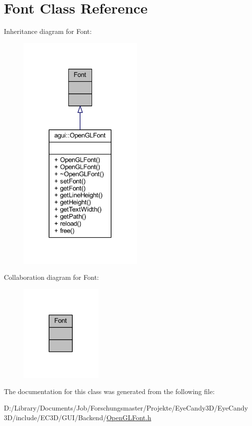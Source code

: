 \hypertarget{class_font}{}\section{Font Class Reference}
\label{class_font}


Inheritance diagram for Font\+:
\nopagebreak
\begin{figure}[H]
\begin{center}
\leavevmode
\includegraphics[width=176pt]{class_font__inherit__graph}
\end{center}
\end{figure}


Collaboration diagram for Font\+:
\nopagebreak
\begin{figure}[H]
\begin{center}
\leavevmode
\includegraphics[width=116pt]{class_font__coll__graph}
\end{center}
\end{figure}


The documentation for this class was generated from the following file\+:\begin{DoxyCompactItemize}
\item 
D\+:/\+Library/\+Documents/\+Job/\+Forschungsmaster/\+Projekte/\+Eye\+Candy3\+D/\+Eye\+Candy3\+D/include/\+E\+C3\+D/\+G\+U\+I/\+Backend/\mbox{\hyperlink{_open_g_l_font_8h}{Open\+G\+L\+Font.\+h}}\end{DoxyCompactItemize}
